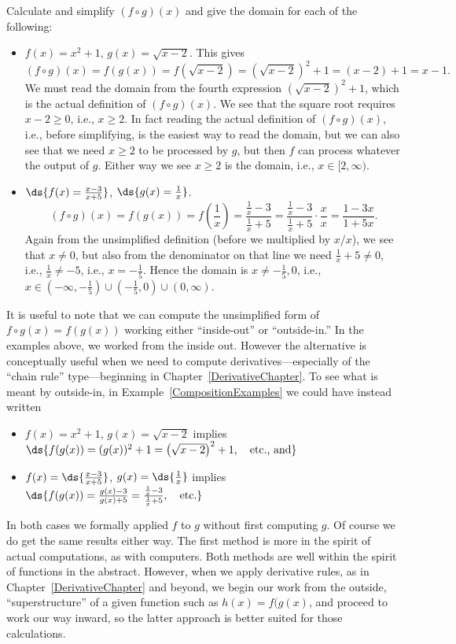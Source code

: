 \bex Calculate and simplify $(f\circ g)(x)$ and give the domain
for each of the following:
\begin{itemize}
\item $f(x)=x^2+1$, $g(x)=\sqrt{x-2}$.  This gives
$$(f\circ g)(x)=f(g(x))
            =f\left(\sqrt{x-2}\right)
            =\left(\sqrt{x-2}\right)^2+1
            =(x-2)+1=x-1.$$
We must read the domain from the fourth expression
$\left(\sqrt{x-2}\right)^2+1$, which is the
actual definition of $(f\circ g)(x)$.  
We see that the square root requires $x-2\ge 0$, i.e., $x\ge 2$.
In fact reading the actual definition of $(f\circ g)(x)$, i.e., 
before simplifying, is the easiest way to read the domain, but
we can also see that we need 
$x\ge 2$ to be processed by $g$, but then $f$ can process
whatever the output of $g$.  Either way we see $x\ge 2$ is the domain,
i.e., $x\in[2,\infty)$.
\item $\ds{f(x)=\frac{x-3}{x+5}}$, $\ds{g(x)=\frac1x}$.
$$
          (f\circ g)(x)=f(g(x))
                       =f\left(\frac1x\right)
                       =\frac{\frac1x-3}{\frac1x+5}
                       =\frac{\frac1x-3}{\frac1x+5}\cdot\frac{x}x
                       =\frac{1-3x}{1+5x}.$$
Again from the unsimplified definition (before we multiplied
by $x/x$), we see that $x\ne0$, but also from
the denominator on that line we need
$\frac1x+5\ne0$, i.e., $\frac1x\ne-5$, i.e., $x=-\frac15$.
Hence the domain is $x\ne-\frac15,0$, i.e.,
$x\in\left(-\infty,-\frac15\right) 
\cup\left(-\frac15,0\right)\cup(0,\infty)$.
\end{itemize}
\label{CompositionExamples}
\eex
It is useful to note that we can compute the unsimplified
form of $f\circ g(x)=f(g(x))$ working either ``inside-out'' or
``outside-in.''  In the examples above, we worked
from the inside out.  However the alternative is conceptually
useful when we need to compute derivatives---especially of
the ``chain rule'' type---beginning in Chapter~\ref{DerivativeChapter}.  
To see what is meant 
by outside-in, in Example~\ref{CompositionExamples} we could
have instead written
\begin{itemize}
\item $f(x)=x^2+1$, $g(x)=\sqrt{x-2}$ implies
$\ds{f(g(x))=(g(x))^2+1=\left(\sqrt{x-2}\right)^2+1, \quad\text{etc., and}}$
\item $f(x)=\ds{\frac{x-3}{x+5}}$, $g(x)=\ds{\frac1x}$ implies
$\ds{f(g(x))=\frac{g(x)-3}{g(x)+5}=\frac{\frac1x-3}{\frac1x+5},
\quad\text{etc.}}$
\end{itemize}
In both cases we formally applied $f$ to $g$ without first computing $g$.
Of course we do get the same results either way.  
The first method is more in the
spirit of actual computations, as with computers.
Both methods are well within the 
spirit of functions in the abstract.  However, when we apply 
derivative rules, as in Chapter~\ref{DerivativeChapter} and beyond,
we begin our work from the outside, ``superstructure'' of a given
function such as $h(x)=f(g(x)$, and proceed to work our way
inward, so the latter approach is better suited for those
calculations.










